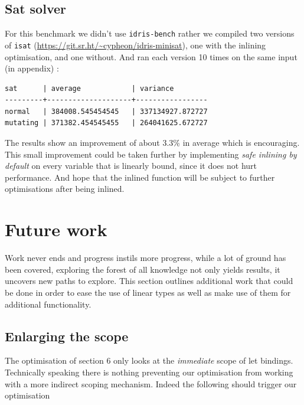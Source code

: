 \documentclass[
]{article}
\begin{document}
\hypertarget{sat-solver}{%
\subsection{Sat solver}\label{sat-solver}}

For this benchmark we didn't use \texttt{idris-bench} rather we compiled
two versions of \texttt{isat}
(\url{https://git.sr.ht/~cypheon/idris-minisat}), one with the inlining
optimisation, and one without. And ran each version 10 times on the same
input (in appendix) :

\begin{verbatim}
sat      | average            | variance
---------+--------------------+-----------------
normal   | 384008.545454545   | 337134927.872727
mutating | 371382.454545455   | 264041625.672727
\end{verbatim}

The results show an improvement of about 3.3\% in average which is
encouraging. This small improvement could be taken further by
implementing \emph{safe inlining by default} on every variable that is
linearly bound, since it does not hurt performance. And hope that the
inlined function will be subject to further optimisations after being
inlined.

\newpage

\hypertarget{future-work}{%
\section{Future work}\label{future-work}}

Work never ends and progress instils more progress, while a lot of
ground has been covered, exploring the forest of all knowledge not only
yields results, it uncovers new paths to explore. This section outlines
additional work that could be done in order to ease the use of linear
types as well as make use of them for additional functionality.

\hypertarget{enlarging-the-scope}{%
\subsection{Enlarging the scope}\label{enlarging-the-scope}}

The optimisation of section 6 only looks at the \emph{immediate} scope
of let bindings. Technically speaking there is nothing preventing our
optimisation from working with a more indirect scoping mechanism. Indeed
the following should trigger our optimisation
\end{document}
